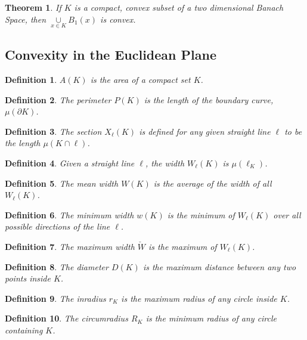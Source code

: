 \documentclass[oneside]{book}
\theoremstyle{mystyle}
\newtheorem{theorem}{Theorem}[section]
\newtheorem{definition}{Definition}[section]
\begin{document}
\begin{theorem}
If $K$ is a compact, convex subset of a two dimensional Banach Space, then $\underset{x\in K}\cup B_{1}(x)$ is convex.
\end{theorem}
%
\subsection{Convexity in the Euclidean Plane}
%
\begin{definition}
$A(K)$ is the area of a compact set $K$.
\end{definition}
%
\begin{definition}
The perimeter $P(K)$ is the length of the boundary curve, $\mu(\partial K)$.
\end{definition}

\begin{definition}
The section $X_{\ell}(K)$ is defined for any given straight line $\ell$ to be the length $\mu(K\cap \ell)$.
\end{definition}

\begin{definition}
Given a straight line $\ell$, the width $W_{\ell}(K)$ is $\mu(\ell_{K})$.
\end{definition}

\begin{definition}
The mean width $W(K)$ is the average of the width of all $W_{\ell}(K)$.
\end{definition}

\begin{definition}
The minimum width $w(K)$ is the minimum of $W_{\ell}(K)$ over all possible directions of the line $\ell$.
\end{definition}

\begin{definition}
The maximum width $\check{W}$ is the maximum of $W_{\ell}(K)$.
\end{definition}

\begin{definition}
The diameter $D(K)$ is the maximum distance between any two points inside $K$.
\end{definition}

\begin{definition}
The inradius $r_K$ is the maximum radius of any circle inside $K$.
\end{definition}

\begin{definition}
The circumradius $R_K$ is the minimum radius of any circle containing $K$.
\end{definition}
\end{document}
